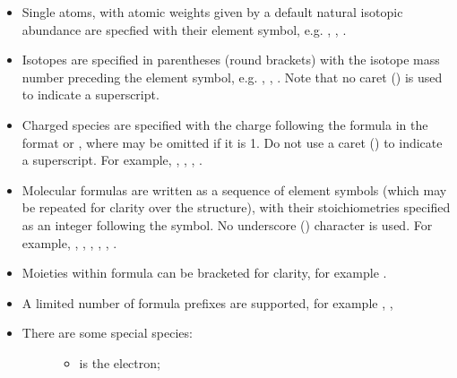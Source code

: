 \documentclass[letterpaper,10pt,english]{sphinxmanual}
\begin{document}
\begin{itemize}
\item {} 
Single atoms, with atomic weights given by a default natural isotopic abundance are specfied with their element symbol, e.g. , , .

\item {} 
Isotopes are specified in parentheses (round brackets) with the isotope mass number preceding the element symbol, e.g. , , . Note that no caret (\sphinxcode{\sphinxupquote{\textasciicircum{}}}) is used to indicate a superscript.

\item {} 
Charged species are specified with the charge following the formula in the format  or , where  may be omitted if it is 1. Do not use a caret (\sphinxcode{\sphinxupquote{\textasciicircum{}}}) to indicate a superscript. For example, , , , .

\item {} 
Molecular formulas are written as a sequence of element symbols (which may be repeated for clarity over the structure), with their stoichiometries specified as an integer following the symbol. No underscore (\sphinxcode{\sphinxupquote{\_}}) character is used. For example, , , , , , .

\item {} 
Moieties within formula can be bracketed for clarity, for example .

\item {} 
A limited number of formula prefixes are supported, for example , , 

\item {} \begin{description}
\item[{There are some special species:}] \leavevmode\begin{itemize}
\item {} 
 is the electron;


\end{itemize}
\end{description}
\end{itemize}
\end{document}
